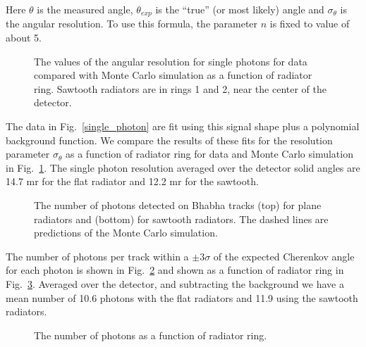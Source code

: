 \documentclass[fleqn,twoside]{article}
\begin{document}
Here $\theta$ is the measured angle, $\theta_{exp}$ is the ``true'' (or most
likely) angle and $\sigma_{\theta}$ is the angular resolution.
To use this formula, the parameter $n$ is fixed to value of about 5.



\begin{figure} [htb]
\vspace{-1.1cm}
\centerline{\epsfxsize 2.6in
} \vspace{-0.7cm}
\caption{\label{bhares_ang} The values of the angular resolution
for single photons for data compared with Monte Carlo simulation
as a function of radiator ring. Sawtooth radiators are in rings 1
and 2, near the center of the detector.}
\vspace{-0.7cm}\end{figure}

The data in Fig.~\ref{single_photon} are fit using this signal
shape plus a polynomial background function. We compare the
results of these fits for the resolution parameter
$\sigma_{\theta}$ as a function of radiator ring for data and
Monte Carlo simulation in Fig.~\ref{bhares_ang}. The single photon
resolution averaged over the detector solid angles are 14.7 mr for
the flat radiator and 12.2 mr for the sawtooth.

\begin{figure} [htb]
\vspace{-.9cm} \centerline{\epsfxsize 2.5in
} \vspace{-0.7cm}
\centerline{\epsfxsize 2.5in }
\vspace{-.7cm} \caption{\label{ngamma} The number of photons
detected on Bhabha tracks (top) for plane radiators and (bottom)
for sawtooth radiators. The dashed lines are predictions of the
Monte Carlo simulation.} \vspace{-0.7cm}\end{figure}

The number of photons per track within a $\pm 3\sigma$ of the
expected Cherenkov angle for each photon is shown in
Fig.~\ref{ngamma} and shown as a function of radiator ring in
Fig.~\ref{bha_photon}. Averaged over the detector, and subtracting
the background we have a mean number of 10.6 photons with the flat
radiators and 11.9 using the sawtooth radiators.



\begin{figure} [htb]
\centerline{\hspace{.9in}\epsfxsize 1.3in
}
\caption{\label{bha_photon} The number of photons as a function of
radiator ring.} \vspace{-0.7cm}\end{figure}
\end{document}
